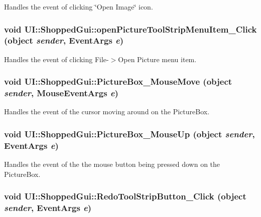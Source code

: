\label{class_u_i_1_1_shopped_gui_a5a4be38d87e3d968e9336400e572b646}
Handles the event of clicking \char`\"{}Open Image\char`\"{} icon. \hypertarget{class_u_i_1_1_shopped_gui_a059988dec5a74fcc82ee2eb503d49118}{
\subsubsection[{openPictureToolStripMenuItem\_\-Click}]{\setlength{\rightskip}{0pt plus 5cm}void UI::ShoppedGui::openPictureToolStripMenuItem\_\-Click (object {\em sender}, \/  EventArgs {\em e})}}
\label{class_u_i_1_1_shopped_gui_a059988dec5a74fcc82ee2eb503d49118}
Handles the event of clicking File-\/$>$Open Picture menu item. \hypertarget{class_u_i_1_1_shopped_gui_a3e9438c31f65604189c8fa3819bb0510}{
\subsubsection[{PictureBox\_\-MouseMove}]{\setlength{\rightskip}{0pt plus 5cm}void UI::ShoppedGui::PictureBox\_\-MouseMove (object {\em sender}, \/  MouseEventArgs {\em e})}}
\label{class_u_i_1_1_shopped_gui_a3e9438c31f65604189c8fa3819bb0510}
Handles the event of the cursor moving around on the PictureBox. \hypertarget{class_u_i_1_1_shopped_gui_a24f789e7efcce9caf5178012245a75fc}{
\subsubsection[{PictureBox\_\-MouseUp}]{\setlength{\rightskip}{0pt plus 5cm}void UI::ShoppedGui::PictureBox\_\-MouseUp (object {\em sender}, \/  EventArgs {\em e})}}
\label{class_u_i_1_1_shopped_gui_a24f789e7efcce9caf5178012245a75fc}
Handles the event of the the mouse button being pressed down on the PictureBox. \hypertarget{class_u_i_1_1_shopped_gui_a1b0a305e8263bd20d979d2d0b04c726b}{
\subsubsection[{RedoToolStripButton\_\-Click}]{\setlength{\rightskip}{0pt plus 5cm}void UI::ShoppedGui::RedoToolStripButton\_\-Click (object {\em sender}, \/  EventArgs {\em e})}}
